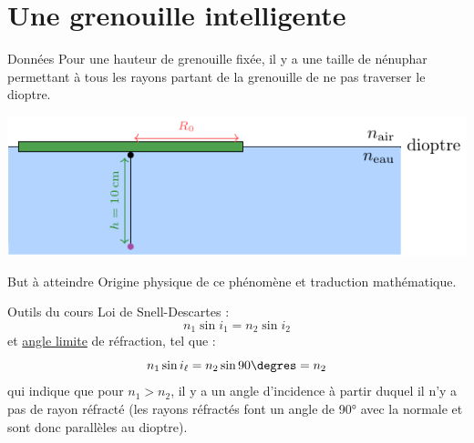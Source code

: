 \documentclass[../main/main.tex]{subfiles}
\begin{document}
\section{Une grenouille intelligente}
\begin{tcbraster}[raster columns=7, raster equal height=rows]
    \begin{NCdefi}[raster multicolumn=4]{Données}
        Pour une hauteur de grenouille fixée, il y a une taille de
        nénuphar permettant à tous les rayons partant de la grenouille de ne
        pas traverser le dioptre.\smallbreak
        \begin{center}
            \includegraphics{../figures/ch2-2-1}   
        \end{center}
    \end{NCdefi}
    \begin{tcolorbox}[blankest, raster multicolumn=3, space to=\myspace]
        \begin{tcbraster}[raster columns=1]
            \begin{NCprop}{But à atteindre}
                Origine physique de ce phénomène et traduction mathématique.
            \end{NCprop}    
            \begin{NCdemo}{Outils du cours}
                Loi de Snell-Descartes :
                \[ n_1\sin i_1 = n_2\sin i_2\]
                et \underline{angle limite} de réfraction, tel que :
                \[ n_1\sin i_\ell = n_2\sin 90\degres = n_2\]
                qui indique que pour $n_1 > n_2$, il y a un angle d'incidence à
                partir duquel il n'y a pas de rayon réfracté (les rayons
                réfractés font un angle de 90° avec la normale et sont donc
                parallèles au dioptre).
            \end{NCdemo}
        \end{tcbraster}
    \end{tcolorbox}
\end{tcbraster}
\end{document}
